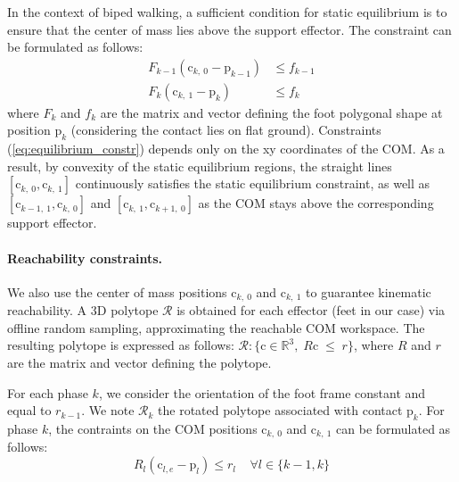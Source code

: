 In the context of biped walking, a sufficient condition for static equilibrium is to ensure that the center of mass lies above the support effector.
The constraint can be formulated as follows:
\begin{equation}
    \label{eq:equilibrium_constr}
    \begin{aligned}
        F_{k-1} (\mbox{c}_{k,\:0}-\mbox{p}_{k-1}) &\leq  f_{k-1}\\%
        F_{k} (\mbox{c}_{k,\:1}-\mbox{p}_{k}) &\leq  f_{k}%
    \end{aligned}
\end{equation}
where $F_k$ and $f_k$ are the matrix and vector defining the foot polygonal shape at position $\mbox{p}_k$ (considering the contact lies on flat ground).
Constraints (\ref{eq:equilibrium_constr}) depends only on the xy coordinates of the COM.
As a result, by convexity of the static equilibrium regions, the straight lines $[\mbox{c}_{k,\:0}, \mbox{c}_{k,\:1}]$ continuously satisfies the static equilibrium
constraint, as well as $[\mbox{c}_{k-1,\:1}, \mbox{c}_{k,\:0}]$ and $[\mbox{c}_{k,\:1}, \mbox{c}_{k+1,\:0}]$ as the COM stays above the corresponding support effector.

\paragraph{Reachability constraints.}
We also use the center of mass positions $\mbox{c}_{k,\:0}$ and $\mbox{c}_{k,\:1}$ to guarantee kinematic reachability.
A 3D polytope $\mathcal{R}$ is obtained for each effector (feet in our case) via offline random sampling, approximating the reachable COM workspace.
The resulting polytope is expressed as follows: $\mathcal{R} : \{\mbox{c} \in \mathbb{R}^3 , \; \! R \mbox{c} \; \leq \; \! r\}$, where $R$ and $r$ are the matrix and vector defining the polytope.

For each phase $k$, we consider the orientation of the foot frame constant and equal to $r_{k-1}$.
We note $\mathcal{R}_k$ the rotated polytope associated with contact $\mbox{p}_{k}$.
For phase $k$, the contraints on the COM positions $\mbox{c}_{k,\:0}$ and $\mbox{c}_{k,\:1}$ can be formulated as follows:
\begin{equation}
    R_{l} (\mbox{c}_{l,e} - \mbox{p}_{l}) \leq r_l \;\;\;\; \forall l \in \{k-1,k\}
\end{equation}

